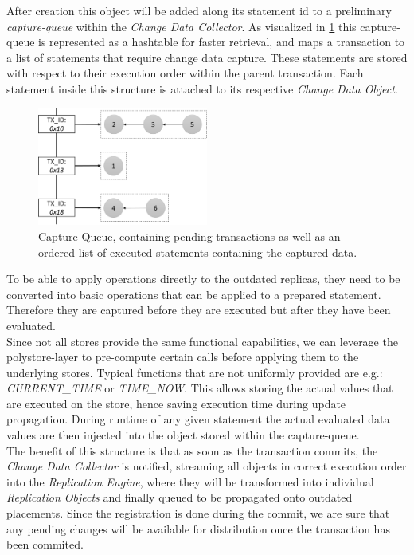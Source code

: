 After creation this object will be added along its statement id to a preliminary \emph{capture-queue} within the \emph{Change Data Collector}. 
As visualized in \ref{fig:hashtable} this capture-queue is represented as a hashtable for 
faster retrieval, and maps a transaction to a list of statements that require change data capture. 
These statements are stored with respect to their execution order within the parent transaction.
Each statement inside this structure is attached to its respective \emph{Change Data Object}.\\

\begin{figure}[t]
    \centering
    \includegraphics[width=0.5\textwidth]{Figures/hashtable.png}
    \caption{Capture Queue, containing pending transactions as well as an ordered list of executed statements containing the captured data.}
    \label{fig:hashtable}
\end{figure}

To be able to apply operations directly to the outdated replicas, they need to be converted into basic operations that can be applied to a prepared statement.
Therefore they are captured before they are executed but after they have been evaluated.\\
Since not all stores provide the same functional capabilities, we can leverage the polystore-layer to pre-compute certain calls before applying them to the underlying stores.
Typical functions that are not uniformly provided are e.g.: \emph{CURRENT\_TIME} or \emph{TIME\_NOW}. This allows storing the actual values that are executed on the store,
hence saving execution time during update propagation.
During runtime of any given statement the actual evaluated data values are then injected into the object stored within the capture-queue.\\
The benefit of this structure is that as soon as the transaction commits, the \emph{Change Data Collector} is notified, streaming all objects in correct execution order
into the \emph{Replication Engine}, where they will be transformed into individual \emph{Replication Objects} and finally queued to be propagated onto outdated placements. 
Since the registration is done during the commit, we are sure that any pending changes will be available for distribution once the transaction has been commited.



